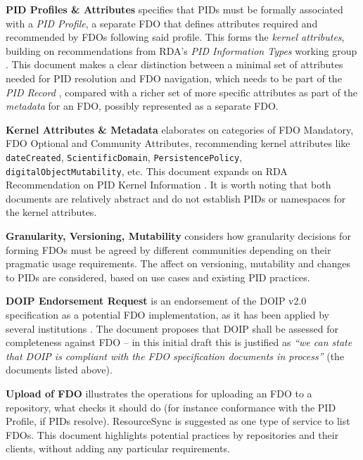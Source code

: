 \documentclass[fleqn,10pt,lineno]{wlpeerjlua}
\begin{document}
\textbf{PID Profiles \& Attributes} \autocite{fdo-PIDProfileAttributes} specifies that PIDs must be formally associated with a \emph{PID Profile}, a separate FDO that defines attributes required and recommended by FDOs following said profile. This forms the \emph{kernel attributes}, building on recommendations from RDA's \emph{PID Information Types} working group \autocite{weigelRDARecommendationPID2018}. This document makes a clear distinction between a minimal set of attributes needed for PID resolution and FDO navigation, which needs to be part of the \emph{PID Record} \autocite{islam_2023}, compared with a richer set of more specific attributes as part of the \emph{metadata} for an FDO, possibly represented as a separate FDO.

\textbf{Kernel Attributes \& Metadata} \autocite{fdo-KernelAttributes} elaborates on categories of FDO Mandatory, FDO Optional and Community Attributes, recommending kernel attributes like \texttt{dateCreated}, \texttt{ScientificDomain}, \texttt{PersistencePolicy}, \texttt{digitalObjectMutability}, etc. This document expands on RDA Recommendation on PID Kernel Information \autocite{weigelRDARecommendationPID2018}. It is worth noting that both documents are relatively abstract and do not establish PIDs or namespaces for the kernel attributes.

\textbf{Granularity, Versioning, Mutability} \autocite{fdo-Granularity} considers how granularity decisions for forming FDOs must be agreed by different communities depending on their pragmatic usage requirements. The affect on versioning, mutability and changes to PIDs are considered, based on use cases and existing PID practices.

\textbf{DOIP Endorsement Request} \autocite{fdo-DOIPEndorsement} is an endorsement of the DOIP v2.0 \autocite{foundationDigitalObjectInterface} specification as a potential FDO implementation, as it has been applied by several institutions \autocite{wittenburgFAIRDigitalObject2022b}. The document proposes that DOIP shall be assessed for completeness against FDO -- in this initial draft this is justified as \emph{``we can state that DOIP is compliant with the FDO specification documents in process''} (the documents listed above).

\textbf{Upload of FDO} \autocite{fdo-FDO-Upload} illustrates the operations for uploading an FDO to a repository, what checks it should do (for instance conformance with the PID Profile, if PIDs resolve). ResourceSync \autocite{ResourceSyncFrameworkSpecification} is suggested as one type of service to list FDOs. This document highlights potential practices by repositories and their clients, without adding any particular requirements.
\end{document}
